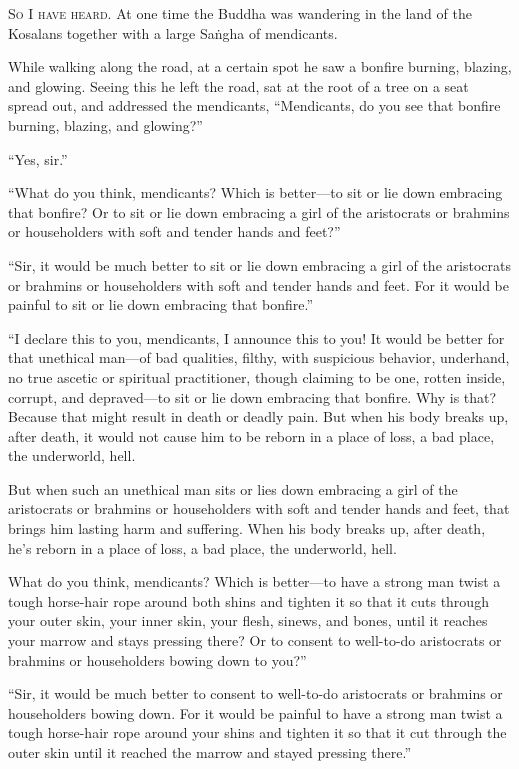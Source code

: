 \documentclass[12pt,openany]{book}%
\newcommand*{\scevam}[1]{\textsc{#1}}
\begin{document}
\scevam{So I have heard. }At one time the Buddha was wandering in the land of the Kosalans together with a large \textsanskrit{Saṅgha} of mendicants. 

While walking along the road, at a certain spot he saw a bonfire burning, blazing, and glowing. Seeing this he left the road, sat at the root of a tree on a seat spread out, and addressed the mendicants, “Mendicants, do you see that bonfire burning, blazing, and glowing?” 

“Yes, sir.” 

“What do you think, mendicants? Which is better—to sit or lie down embracing that bonfire? Or to sit or lie down embracing a girl of the aristocrats or brahmins or householders with soft and tender hands and feet?” 

“Sir, it would be much better to sit or lie down embracing a girl of the aristocrats or brahmins or householders with soft and tender hands and feet. For it would be painful to sit or lie down embracing that bonfire.” 

“I declare this to you, mendicants, I announce this to you! It would be better for that unethical man—of bad qualities, filthy, with suspicious behavior, underhand, no true ascetic or spiritual practitioner, though claiming to be one, rotten inside, corrupt, and depraved—to sit or lie down embracing that bonfire. Why is that? Because that might result in death or deadly pain. But when his body breaks up, after death, it would not cause him to be reborn in a place of loss, a bad place, the underworld, hell. 

But when such an unethical man sits or lies down embracing a girl of the aristocrats or brahmins or householders with soft and tender hands and feet, that brings him lasting harm and suffering. When his body breaks up, after death, he’s reborn in a place of loss, a bad place, the underworld, hell. 

What do you think, mendicants? Which is better—to have a strong man twist a tough horse-hair rope around both shins and tighten it so that it cuts through your outer skin, your inner skin, your flesh, sinews, and bones, until it reaches your marrow and stays pressing there? Or to consent to well-to-do aristocrats or brahmins or householders bowing down to you?” 

“Sir, it would be much better to consent to well-to-do aristocrats or brahmins or householders bowing down. For it would be painful to have a strong man twist a tough horse-hair rope around your shins and tighten it so that it cut through the outer skin until it reached the marrow and stayed pressing there.” 
\end{document}
